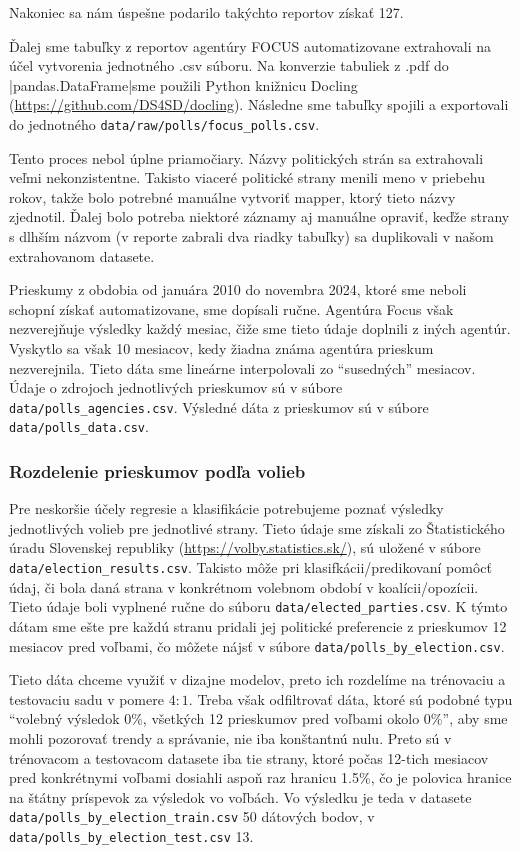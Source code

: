 \documentclass[report.tex]{subfiles}
\begin{document}
Nakoniec sa nám úspešne podarilo takýchto reportov získať 127. 

Ďalej sme tabuľky z reportov agentúry FOCUS automatizovane extrahovali na účel vytvorenia jednotného .csv súboru. Na konverzie tabuliek z .pdf do \pyth|pandas.DataFrame|sme použili Python knižnicu Docling (\href{https://github.com/DS4SD/docling}{https://github.com/DS4SD/docling}). Následne sme tabuľky spojili a exportovali do jednotného \verb*|data/raw/polls/focus_polls.csv|.

Tento proces nebol úplne priamočiary. Názvy politických strán sa extrahovali veľmi nekonzistentne.
Takisto viaceré politické strany menili meno v priebehu rokov, takže bolo potrebné manuálne vytvoriť mapper, ktorý tieto názvy zjednotil. Ďalej bolo potreba niektoré záznamy aj manuálne opraviť, keďže strany s dlhším názvom (v reporte zabrali dva riadky tabuľky) sa duplikovali v našom extrahovanom datasete.

Prieskumy z obdobia od januára 2010 do novembra 2024, ktoré sme neboli schopní získať automatizovane, sme dopísali ručne. Agentúra Focus však nezverejňuje výsledky každý mesiac, čiže sme tieto údaje doplnili z iných agentúr. Vyskytlo sa však 10 mesiacov, kedy žiadna známa agentúra prieskum nezverejnila. Tieto dáta sme lineárne interpolovali zo \enquote{susedných} mesiacov. Údaje o zdrojoch jednotlivých prieskumov sú v súbore \verb*|data/polls_agencies.csv|. Výsledné dáta z prieskumov sú v súbore \verb*|data/polls_data.csv|.

\subsubsection*{Rozdelenie prieskumov podľa volieb}

Pre neskoršie účely regresie a klasifikácie potrebujeme poznať výsledky jednotlivých volieb pre jednotlivé strany. Tieto údaje sme získali zo Štatistického úradu Slovenskej republiky (\href{https://volby.statistics.sk/}{https://volby.statistics.sk/}), sú uložené v súbore \verb*|data/election_results.csv|. Takisto môže pri klasifkácii/predikovaní pomôcť údaj, či bola daná strana v konkrétnom volebnom období v koalícii/opozícii. Tieto údaje boli vyplnené ručne do súboru \verb*|data/elected_parties.csv|. K týmto dátam sme ešte pre každú stranu pridali jej politické preferencie z prieskumov 12 mesiacov pred voľbami, čo môžete nájsť v súbore \verb*|data/polls_by_election.csv|.

Tieto dáta chceme využiť v dizajne modelov, preto ich rozdelíme na trénovaciu a testovaciu sadu v pomere $4:1$. Treba však odfiltrovať dáta, ktoré sú podobné typu \enquote{volebný výsledok 0\%, všetkých 12 prieskumov pred voľbami okolo 0\%}, aby sme mohli pozorovať trendy a správanie, nie iba konštantnú nulu. Preto sú v trénovacom a testovacom datasete iba tie strany, ktoré počas 12-tich mesiacov pred konkrétnymi voľbami dosiahli aspoň raz hranicu 1.5\%, čo je polovica hranice na štátny príspevok za výsledok vo voľbách. Vo výsledku je teda v datasete \verb*|data/polls_by_election_train.csv| 50 dátových bodov, v \verb*|data/polls_by_election_test.csv| 13.
\end{document}
